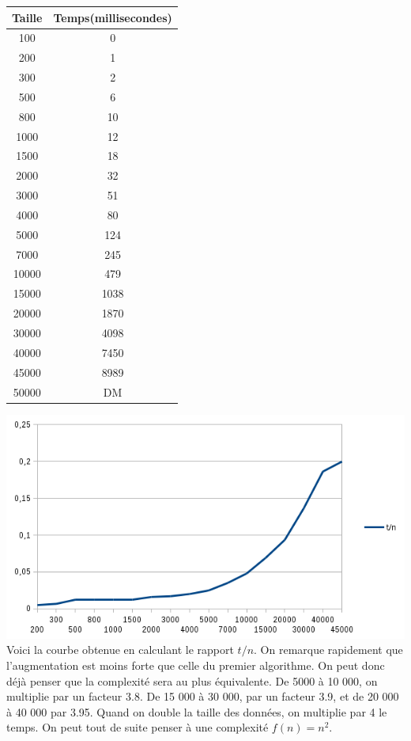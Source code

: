\documentclass[a4paper, 12pt]{article}
\begin{document}
\begin{minipage}[c]{0.4\linewidth}
\begin{tabular}{|c|c|}
\hline
Taille & Temps(millisecondes) \\
\hline
100	& 0\\
200	& 1\\
300	& 2\\
500 & 6\\
800& 	10\\
1000& 	12\\
1500& 	18\\
2000& 	32\\
3000& 	51\\
4000& 	80\\
5000& 	124\\
7000& 	245\\
10000& 	479\\
15000& 	1038\\
20000& 	1870\\
30000& 	4098\\
40000& 	7450\\
45000& 	8989\\
50000& 	DM\\
\hline
\end{tabular}
\end{minipage}\hfill
\begin{minipage}[c]{0.6\linewidth}
	\includegraphics[scale=0.6]{curve_algo_2.png}
	 	Voici la courbe obtenue en calculant le rapport $t/n$. On remarque rapidement que l'augmentation est moins forte que celle du premier algorithme. On peut donc déjà penser que la complexité sera au plus équivalente. De 5000 à 10 000, on multiplie par un facteur 3.8. De 15 000 à 30 000, par un facteur 3.9, et de 20 000 à 40 000 par 3.95. Quand on double la taille des données, on multiplie par 4 le temps. On peut tout de suite penser à une complexité $f(n) = n^2$.
\end{minipage}\hfill
\end{document}
